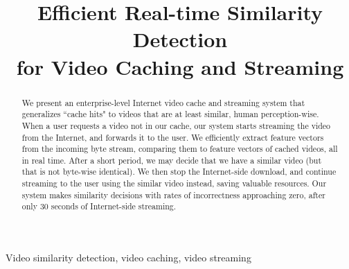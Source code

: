 \documentclass{article}
\title{Efficient Real-time Similarity Detection\\for Video Caching and Streaming}
\begin{document}
\ninept
%
\maketitle
%
\begin{abstract}
We present an enterprise-level Internet video cache and streaming system that generalizes ``cache hits" to videos that are at least similar, human perception-wise. When a user requests a video not in our cache, our system starts streaming the video from the Internet, and forwards it to the user. We efficiently extract feature vectors from the incoming byte stream, comparing them to feature vectors of cached videos, all in real time. After a short period, we may decide that we have a similar video (but that is not byte-wise identical). We then stop the Internet-side download, and continue streaming to the user using the similar video instead, saving valuable resources. Our system makes similarity decisions with rates of incorrectness approaching zero, after only $30$ seconds of Internet-side streaming.
\end{abstract}
%
\begin{keywords}
Video similarity detection, video caching, video streaming
\end{keywords}
%
\end{document}
